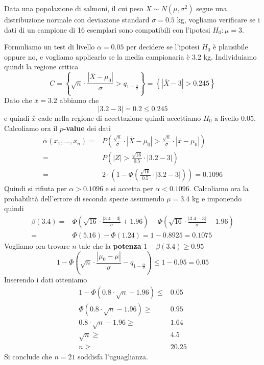 \begin{example}
	Data una popolazione di salmoni, il cui peso $X \sim N(\mu, \sigma^2)$ segue una distribuzione
	normale con deviazione standard $\sigma = 0.5$ kg, vogliamo verificare se i dati di un campione
	di 16 esemplari sono compatibili con l'ipotesi $H_0 : \mu = 3$.

	Formuliamo un test di livello $\alpha = 0.05$ per decidere se l'ipotesi $H_0$ è plausibile
	oppure no, e vogliamo applicarlo se la media campionaria è 3.2 kg. Individuiamo quindi la
	regione critica
	\[
		C = \left\{ \sqrt{n} \cdot
		\frac{|\bar{X} - \mu_0|}{\sigma} > q_{1-\frac{\alpha}{2}} \right\} =
		\left\{ |\bar{X}-3| > 0.245 \right\}
	\]
	Dato che $\bar{x} = 3.2$ abbiamo che
	\[ |3.2 - 3| = 0.2 \leq 0.245 \]
	e quindi $\bar{x}$ cade nella regione di accettazione quindi accettiamo $H_0$ a livello 0.05.
	Calcoliamo ora il \textbf{$p$-value} dei dati
	\begin{align*}
		\bar{\alpha} (x_1, \dots, x_n) = &
		P \left( \frac{\sqrt{n}}{\sigma} \cdot |\bar{X} - \mu_0| >
		\frac{\sqrt{n}}{\sigma} \cdot |\bar{x} - \mu_0| \right)      \\
		=                                &
		P \left( |Z| > \frac{\sqrt{16}}{0.5} \cdot |3.2 - 3| \right) \\
		=                                &
		2 \cdot \left( 1 - \Phi \left( \frac{\sqrt{16}}{0.5} \cdot
			|3.2 - 3| \right) \right) = 0.1096
	\end{align*}
	Quindi si rifiuta per $\alpha > 0.1096$ e si accetta per $\alpha < 0.1096$. Calcoliamo ora la
	probabilità dell'errore di seconda specie assumendo $\mu = 3.4$ kg e imponendo quindi
	\begin{align*}
		\beta(3.4) = & \Phi \left( \sqrt{16} \cdot \frac{|3.4 - 3|}{\sigma} + 1.96 \right) -
		\Phi \left( \sqrt{16} \cdot \frac{|3.4 - 3|}{\sigma} - 1.96 \right)                  \\
		=            & \Phi(5.16) - \Phi(1.24) = 1 - 0.8925 = 0.1075
	\end{align*}
	Vogliamo ora trovare $n$ tale che la \textbf{potenza} $1 - \beta(3.4) \geq 0.95$
	\[
		1 - \Phi \left( \sqrt{n} \cdot \frac{|\mu_0 - \mu|}{\sigma}
		- q_{1 - \frac{\alpha}{2}} \right) \leq 1 - 0.95 = 0.05
	\]
	Inserendo i dati otteniamo
	\begin{align*}
		1 - \Phi \left( 0.8 \cdot \sqrt{n} - 1.96 \right) \leq & 0.05  \\
		\Phi \left( 0.8 \cdot \sqrt{n} - 1.96 \right) \geq     & 0.95  \\
		0.8 \cdot \sqrt{n} - 1.96 \geq                         & 1.64  \\
		\sqrt{n} \geq                                          & 4.5   \\
		n \geq                                                 & 20.25
	\end{align*}
	Si conclude che $n = 21$ soddisfa l'uguaglianza.
\end{example}

